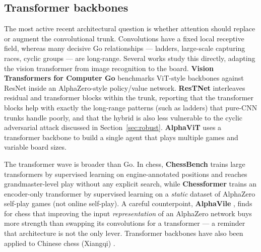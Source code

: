 \documentclass[11pt]{article}
\begin{document}
\subsection{Transformer backbones}
The most active recent architectural question is whether attention should replace or
augment the convolutional trunk. Convolutions have a fixed local receptive field, whereas
many decisive Go relationships --- ladders, large-scale capturing races, cyclic groups ---
are long-range. Several works study this directly, adapting the vision transformer
\cite{vit2021} from image recognition to the board. \textbf{Vision Transformers for
Computer Go} \cite{vitgo2023} benchmarks ViT-style backbones against ResNet inside an
AlphaZero-style policy/value network. \textbf{ResTNet} \cite{restnet2025} interleaves
residual and transformer blocks within the trunk, reporting that the transformer blocks
help with exactly the long-range patterns (such as ladders) that pure-CNN trunks handle
poorly, and that the hybrid is also less vulnerable to the cyclic adversarial attack
discussed in Section~\ref{sec:robust}. \textbf{AlphaViT} \cite{alphavit2024} uses a
transformer backbone to build a single agent that plays multiple games and variable board
sizes.

The transformer wave is broader than Go. In chess, \textbf{ChessBench} \cite{chessbench2024}
trains large transformers by supervised learning on engine-annotated positions and reaches
grandmaster-level play without any explicit search, while \textbf{Chessformer}
\cite{chessformer2024} trains an encoder-only transformer by supervised learning on a
\emph{static} dataset of AlphaZero self-play games (not online self-play).
A careful counterpoint, \textbf{AlphaVile} \cite{alphavile2024}, finds for chess that
improving the input \emph{representation} of an AlphaZero network buys more strength than
swapping its convolutions for a transformer --- a reminder that architecture is not
the only lever. Transformer backbones have also been applied to Chinese chess (Xiangqi)
\cite{xiangqi2024}.
\end{document}
